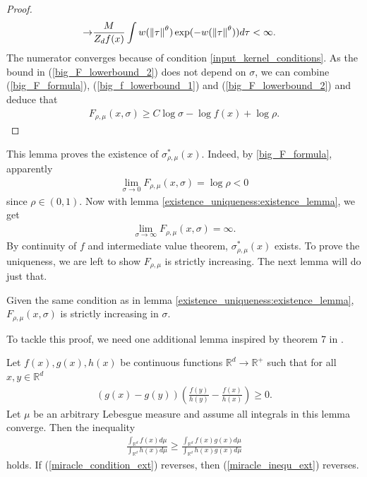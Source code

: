 \begin{proof}
\begin{align}
        \to  & \frac{M}{Z_d f(x)} \int w(\left\lVert\tau\right\rVert^{\theta})\exp(-w(\left\lVert\tau\right\rVert^{\theta}))d\tau < \infty.
    \end{align}
    The numerator converges because of condition \ref{input_kernel_conditions}. As the bound in (\ref{big_F_lowerbound_2}) does not depend on $\sigma$, we can combine (\ref{big_F_formula}), (\ref{big_f_lowerbound_1}) and (\ref{big_F_lowerbound_2}) and deduce that
    \begin{align}
        F_{\rho,\mu}(x,\sigma) \geq C \log \sigma - \log f(x) + \log \rho.
    \end{align}
\end{proof}
This lemma proves the existence of $\sigma^*_{\rho,\mu}(x)$. Indeed, by \eqref{big_F_formula}, apparently
\begin{align} \label{existence_uniqueness:limit_1}
    \lim_{\sigma \to 0} F_{\rho,\mu}(x,\sigma) = \log \rho < 0
\end{align}
since $\rho \in (0,1)$. Now with lemma \ref{existence_uniqueness:existence_lemma}, we get
\begin{align} \label{existence_uniqueness:limit_2}
    \lim_{\sigma \to \infty} F_{\rho,\mu}(x,\sigma) = \infty.
\end{align}
By continuity of $f$ and intermediate value theorem, $\sigma^*_{\rho,\mu}(x)$ exists. To prove the uniqueness, we are left to show $F_{\rho,\mu}$ is strictly increasing. The next lemma will do just that.
\begin{lemma} \label{existence_uniqueness:uniqueness_lemma}
    Given the same condition as in lemma \ref{existence_uniqueness:existence_lemma}, $F_{\rho,\mu}(x,\sigma)$ is strictly increasing in $\sigma$.
\end{lemma}
To tackle this proof, we need one additional lemma inspired by theorem 7 in \citep{liu2000inequ}.
\begin{lemma} \label{miracle_lemma_ext}
    Let $f(x),g(x),h(x)$ be continuous functions $\mathbb{R}^d \to \mathbb{R}^+$ such that for all $x,y \in \mathbb{R}^d$
    \begin{align} \label{miracle_condition_ext}
        \left(g(x)-g(y)\right)\left(\frac{f(y)}{h(y)}-\frac{f(x)}{h(x)}\right) \geq 0.
    \end{align}
    Let $\mu$ be an arbitrary Lebesgue measure and assume all integrals in this lemma converge. Then the inequality
    \begin{align} \label{miracle_inequ_ext}
        \frac{\int_{\mathbb{R}^d} f(x)d\mu}{\int_{\mathbb{R}^d} h(x)d\mu} \geq \frac{\int_{\mathbb{R}^d} f(x)g(x)d\mu}{\int_{\mathbb{R}^d} h(x)g(x)d\mu}
    \end{align}
    holds. If (\ref{miracle_condition_ext}) reverses, then (\ref{miracle_inequ_ext}) reverses.
\end{lemma}
